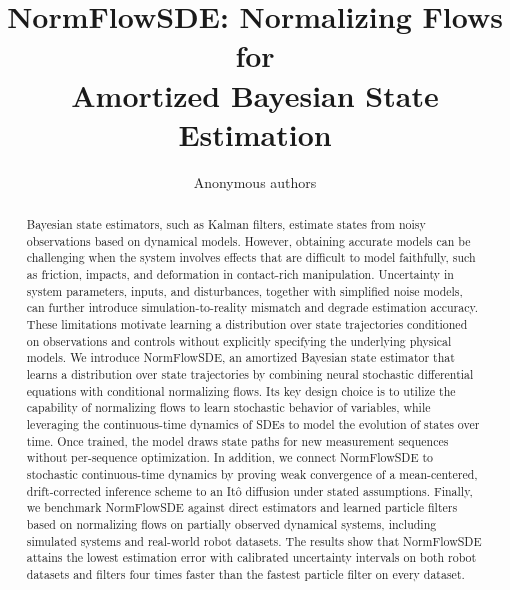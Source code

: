 \documentclass[10pt]{article}
\title{NormFlowSDE: Normalizing Flows for\\Amortized Bayesian State Estimation}
\author{\name Anonymous authors}
\begin{document}
\maketitle
\begin{abstract}
Bayesian state estimators, such as Kalman filters, estimate states from noisy observations based on dynamical models. However, obtaining accurate models can be challenging when the system involves effects that are difficult to model faithfully, such as friction, impacts, and deformation in contact-rich manipulation. Uncertainty in system parameters, inputs, and disturbances, together with simplified noise models, can further introduce simulation-to-reality mismatch and degrade estimation accuracy. These limitations motivate learning a distribution over state trajectories conditioned on observations and controls without explicitly specifying the underlying physical models.
We introduce NormFlowSDE, an amortized Bayesian state estimator that learns a distribution over state trajectories by combining neural stochastic differential equations with conditional normalizing flows.
Its key design choice is to utilize the capability of normalizing flows to learn stochastic behavior of variables, while leveraging the continuous-time dynamics of SDEs to model the evolution of states over time.
Once trained, the model draws state paths for new measurement sequences without per-sequence optimization. 
In addition, we connect NormFlowSDE to stochastic continuous-time dynamics by proving weak convergence of a mean-centered, drift-corrected inference scheme to an It\^o diffusion under stated assumptions.
Finally, we benchmark NormFlowSDE against direct estimators and learned particle filters based on normalizing flows on partially observed dynamical systems, including simulated systems and real-world robot datasets.
The results show that NormFlowSDE attains the lowest estimation error with calibrated uncertainty intervals on both robot datasets and filters four times faster than the fastest particle filter on every dataset.
\end{abstract}







\clearpage
\appendix



\end{document}
